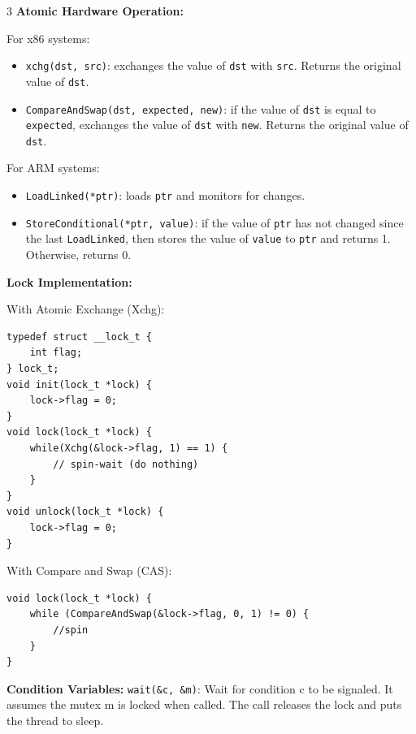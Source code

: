 \documentclass[8pt]{innovativeinnovation-cheatsheet}
\begin{document}
\begin{multicols*}{3}
\textbf{Atomic Hardware Operation:}

For x86 systems:
\begin{itemize}
      \item \texttt{xchg(dst, src)}: exchanges the value of \texttt{dst} with \texttt{src}. Returns the original value of \texttt{dst}.
      \item \texttt{CompareAndSwap(dst, expected, new)}: if the value of \texttt{dst} is equal to \texttt{expected}, exchanges the value of \texttt{dst} with \texttt{new}. Returns the original value of \texttt{dst}.
\end{itemize}
For ARM systems:
\begin{itemize}
      \item \texttt{LoadLinked(*ptr)}: loads \texttt{ptr} and monitors for changes.
      \item \texttt{StoreConditional(*ptr, value)}: if the value of \texttt{ptr} has not changed since the last \texttt{LoadLinked}, then stores the value of \texttt{value} to \texttt{ptr} and returns 1. Otherwise, returns 0.
\end{itemize}



\textbf{Lock Implementation:}

With Atomic Exchange (Xchg):
\begin{lstlisting}
typedef struct __lock_t {
    int flag;
} lock_t;
void init(lock_t *lock) {
    lock->flag = 0;
}
void lock(lock_t *lock) {
    while(Xchg(&lock->flag, 1) == 1) {
        // spin-wait (do nothing)
    }
}
void unlock(lock_t *lock) {
    lock->flag = 0;
}
\end{lstlisting}

With Compare and Swap (CAS):
\begin{lstlisting}
void lock(lock_t *lock) {
    while (CompareAndSwap(&lock->flag, 0, 1) != 0) {
        //spin
    }
}
\end{lstlisting}


\textbf{Condition Variables:}
\texttt{wait(\&c, \&m)}: Wait for condition c to be signaled. It assumes the mutex m is locked when called. The call releases the lock and puts the thread to sleep. 


\end{multicols*}
\end{document}

